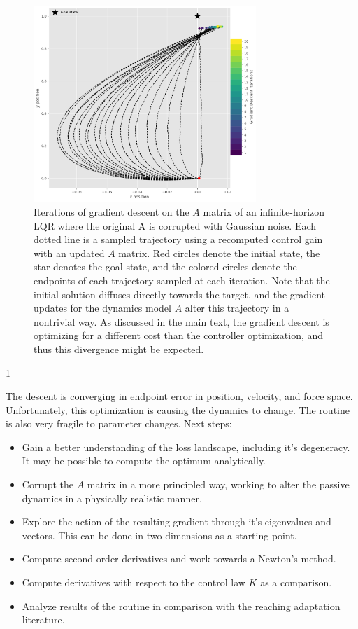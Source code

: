 \documentclass[
  a4paper,
]{article}
\providecommand{\tightlist}{%
  \setlength{\itemsep}{0pt}\setlength{\parskip}{0pt}}
\begin{document}
\begin{figure}
\hypertarget{fig:gradient_descent}{%
\centering
\includegraphics[width=0.75\textwidth,height=\textheight]{images/simulations/gradient_descent.pdf}
\caption{Iterations of gradient descent on the \(A\) matrix of an
infinite-horizon LQR where the original A is corrupted with Gaussian
noise. Each dotted line is a sampled trajectory using a recomputed
control gain with an updated \(A\) matrix. Red circles denote the
initial state, the star denotes the goal state, and the colored circles
denote the endpoints of each trajectory sampled at each iteration. Note
that the initial solution diffuses directly towards the target, and the
gradient updates for the dynamics model \(A\) alter this trajectory in a
nontrivial way. As discussed in the main text, the gradient descent is
optimizing for a different cost than the controller optimization, and
thus this divergence might be expected.}\label{fig:gradient_descent}
}
\end{figure}

\cref{fig:gradient_descent}

The descent is converging in endpoint error in position, velocity, and
force space. Unfortunately, this optimization is causing the dynamics to
change. The routine is also very fragile to parameter changes. Next
steps:

\begin{itemize}
\tightlist
\item
  Gain a better understanding of the loss landscape, including it's
  degeneracy. It may be possible to compute the optimum analytically.
\item
  Corrupt the \(A\) matrix in a more principled way, working to alter
  the passive dynamics in a physically realistic manner.
\item
  Explore the action of the resulting gradient through it's eigenvalues
  and vectors. This can be done in two dimensions as a starting point.
\item
  Compute second-order derivatives and work towards a Newton's method.
\item
  Compute derivatives with respect to the control law \(K\) as a
  comparison.
\item
  Analyze results of the routine in comparison with the reaching
  adaptation literature.
\end{itemize}
\end{document}
